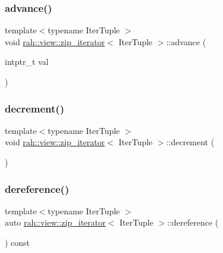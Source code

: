 \subsubsection{\texorpdfstring{advance()}{advance()}}
{\footnotesize\ttfamily template$<$typename Iter\+Tuple $>$ \\
void \mbox{\hyperlink{structrah_1_1view_1_1zip__iterator}{rah\+::view\+::zip\+\_\+iterator}}$<$ Iter\+Tuple $>$\+::advance (\begin{DoxyParamCaption}\item[{intptr\+\_\+t}]{val }\end{DoxyParamCaption})\hspace{0.3cm}{\ttfamily [inline]}}

\mbox{\label{structrah_1_1view_1_1zip__iterator_a5618c02a5596c1306d1abc0b1413f086}} 
\subsubsection{\texorpdfstring{decrement()}{decrement()}}
{\footnotesize\ttfamily template$<$typename Iter\+Tuple $>$ \\
void \mbox{\hyperlink{structrah_1_1view_1_1zip__iterator}{rah\+::view\+::zip\+\_\+iterator}}$<$ Iter\+Tuple $>$\+::decrement (\begin{DoxyParamCaption}{ }\end{DoxyParamCaption})\hspace{0.3cm}{\ttfamily [inline]}}

\mbox{\label{structrah_1_1view_1_1zip__iterator_a775ecbdf57e02dd926e5b83f0a3bd8c1}} 
\subsubsection{\texorpdfstring{dereference()}{dereference()}}
{\footnotesize\ttfamily template$<$typename Iter\+Tuple $>$ \\
auto \mbox{\hyperlink{structrah_1_1view_1_1zip__iterator}{rah\+::view\+::zip\+\_\+iterator}}$<$ Iter\+Tuple $>$\+::dereference (\begin{DoxyParamCaption}{ }\end{DoxyParamCaption}) const\hspace{0.3cm}{\ttfamily [inline]}}

